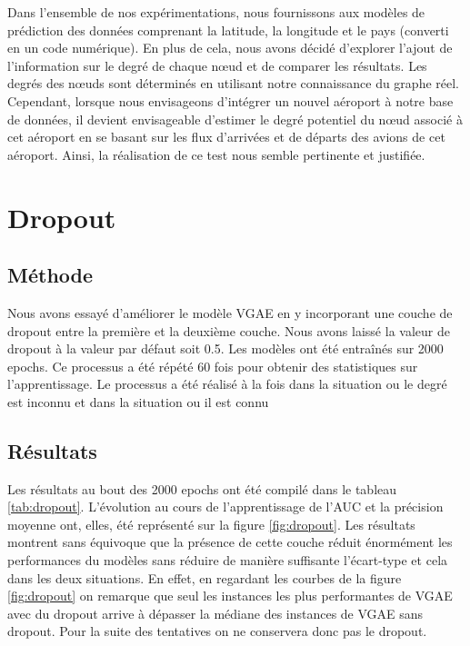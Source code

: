 \documentclass{article}
\begin{document}
Dans l'ensemble de nos expérimentations, nous fournissons aux modèles de prédiction des données comprenant la latitude, la longitude et le pays (converti en un code numérique). En plus de cela, nous avons décidé d'explorer l'ajout de l'information sur le degré de chaque nœud et de comparer les résultats.
Les degrés des nœuds sont déterminés en utilisant notre connaissance du graphe réel. Cependant, lorsque nous envisageons d'intégrer un nouvel aéroport à notre base de données, il devient envisageable d'estimer le degré potentiel du nœud associé à cet aéroport en se basant sur les flux d'arrivées et de départs des avions de cet aéroport. Ainsi, la réalisation de ce test nous semble pertinente et justifiée.


\section{Dropout}
\label{sec:dropout}
\subsection{Méthode}
Nous avons essayé d'améliorer le modèle VGAE en y incorporant une couche de dropout entre la première et la deuxième couche. 
Nous avons laissé la valeur de dropout à la valeur par défaut soit 0.5. 
Les modèles ont été entraînés sur 2000 epochs. 
Ce processus a été répété 60 fois pour obtenir des statistiques sur l'apprentissage.
Le processus a été réalisé à la fois dans la situation ou le degré est inconnu et dans la situation ou il est connu

\subsection{Résultats}
Les résultats au bout des 2000 epochs ont été compilé dans le tableau \ref{tab:dropout}.
L'évolution au cours de l'apprentissage de l'AUC et la précision moyenne ont, elles, été représenté sur la figure \ref{fig:dropout}.
Les résultats montrent sans équivoque que la présence de cette couche réduit énormément les performances du modèles sans réduire de manière suffisante l'écart-type et cela dans les deux situations.
En effet, en regardant les courbes de la figure \ref{fig:dropout} on remarque que seul les instances les plus performantes de VGAE avec du dropout arrive à dépasser la médiane des instances de VGAE sans dropout.
Pour la suite des tentatives on ne conservera donc pas le dropout.
\end{document}
